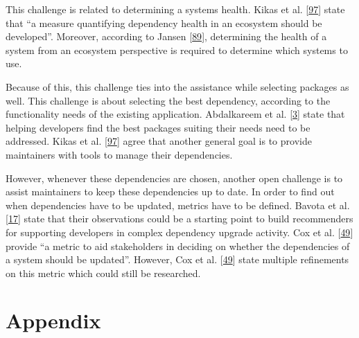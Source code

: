 \documentclass[]{book}
\begin{document}
This challenge is related to determining a systems health. Kikas et al.
{[}\protect\hyperlink{ref-Kikas2017}{97}{]} state that ``a measure
quantifying dependency health in an ecosystem should be developed''.
Moreover, according to Jansen
{[}\protect\hyperlink{ref-Jansen2014}{89}{]}, determining the health of
a system from an ecosystem perspective is required to determine which
systems to use.

Because of this, this challenge ties into the assistance while selecting
packages as well. This challenge is about selecting the best dependency,
according to the functionality needs of the existing application.
Abdalkareem et al. {[}\protect\hyperlink{ref-Abdalkareem2017}{3}{]}
state that helping developers find the best packages suiting their needs
need to be addressed. Kikas et al.
{[}\protect\hyperlink{ref-Kikas2017}{97}{]} agree that another general
goal is to provide maintainers with tools to manage their dependencies.

However, whenever these dependencies are chosen, another open challenge
is to assist maintainers to keep these dependencies up to date. In order
to find out when dependencies have to be updated, metrics have to be
defined. Bavota et al. {[}\protect\hyperlink{ref-Bavota2014}{17}{]}
state that their observations could be a starting point to build
recommenders for supporting developers in complex dependency upgrade
activity. Cox et al. {[}\protect\hyperlink{ref-Cox2015}{49}{]} provide
``a metric to aid stakeholders in deciding on whether the dependencies
of a system should be updated''. However, Cox et al.
{[}\protect\hyperlink{ref-Cox2015}{49}{]} state multiple refinements on
this metric which could still be researched.

\hypertarget{appendix}{\section{Appendix}\label{appendix}}
\end{document}
